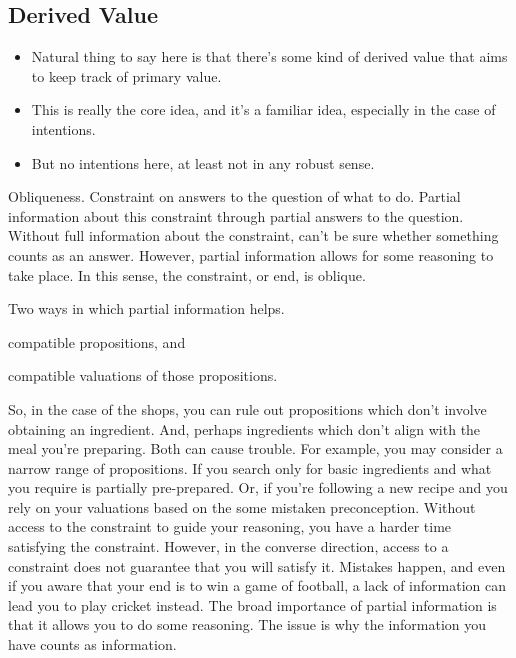 \documentclass[10pt]{article}
\begin{document}
\subsection{Derived Value}
\label{sec:derived-value}


\begin{itemize}
\item Natural thing to say here is that there's some kind of derived value that aims to keep track of primary value.
\item This is really the core idea, and it's a familiar idea, especially in the case of intentions.
\item But no intentions here, at least not in any robust sense.
\end{itemize}


\newpage



Obliqueness.
Constraint on answers to the question of what to do.
Partial information about this constraint through partial answers to the question.
Without full information about the constraint, can't be sure whether something counts as an answer.
However, partial information allows for some reasoning to take place.
In this sense, the constraint, or end, is oblique.

Two ways in which partial information helps.
\begin{enumerate*}[label=\arabic*.]
\item compatible propositions, and
\item compatible valuations of those propositions.
\end{enumerate*}
So, in the case of the shops, you can rule out propositions which don't involve obtaining an ingredient.
And, perhaps ingredients which don't align with the meal you're preparing.
Both can cause trouble.
For example, you may consider a narrow range of propositions.
If you search only for basic ingredients and what you require is partially pre-prepared.
Or, if you're following a new recipe and you rely on your valuations based on the some mistaken preconception.
Without access to the constraint to guide your reasoning, you have a harder time satisfying the constraint.
However, in the converse direction, access to a constraint does not guarantee that you will satisfy it.
Mistakes happen, and even if you aware that your end is to win a game of football, a lack of information can lead you to play cricket instead.
The broad importance of partial information is that it allows you to do some reasoning.
The issue is why the information you have counts as information.
\end{document}
